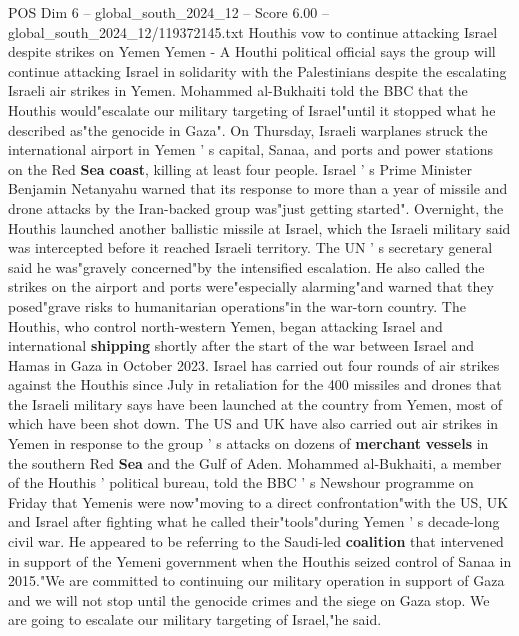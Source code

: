 \begin{textsample}{POS Dim 6 – global\_south\_2024\_12 – Score 6.00 – global\_south\_2024\_12/119372145.txt}  \label{ex:f6_pos_427}
Houthis vow to continue attacking Israel despite strikes on Yemen Yemen - A Houthi political official says the group will continue attacking Israel in solidarity with the Palestinians despite the escalating Israeli air strikes in Yemen.
Mohammed al-Bukhaiti told the BBC that the Houthis would"escalate our military targeting of Israel"until it stopped what he described as"the genocide in Gaza".
On Thursday, Israeli warplanes struck the international airport in Yemen ' s capital, Sanaa, and ports and power stations on the Red \textbf{Sea} \textbf{coast}, killing at least four people.
Israel ' s Prime Minister Benjamin Netanyahu warned that its response to more than a year of missile and drone attacks by the Iran-backed group was"just getting started".
Overnight, the Houthis launched another ballistic missile at Israel, which the Israeli military said was intercepted before it reached Israeli territory.
The UN ' s secretary general said he was"gravely concerned"by the intensified escalation.
He also called the strikes on the airport and ports were"especially alarming"and warned that they posed"grave risks to humanitarian operations"in the war-torn country.
The Houthis, who control north-western Yemen, began attacking Israel and international \textbf{shipping} shortly after the start of the war between Israel and Hamas in Gaza in October 2023.
Israel has carried out four rounds of air strikes against the Houthis since July in retaliation for the 400 missiles and drones that the Israeli military says have been launched at the country from Yemen, most of which have been shot down.
The US and UK have also carried out air strikes in Yemen in response to the group ' s attacks on dozens of \textbf{merchant} \textbf{vessels} in the southern Red \textbf{Sea} and the Gulf of Aden.
Mohammed al-Bukhaiti, a member of the Houthis ' political bureau, told the BBC ' s Newshour programme on Friday that Yemenis were now"moving to a direct confrontation"with the US, UK and Israel after fighting what he called their"tools"during Yemen ' s decade-long civil war.
He appeared to be referring to the Saudi-led \textbf{coalition} that intervened in support of the Yemeni government when the Houthis seized control of Sanaa in 2015."We are committed to continuing our military operation in support of Gaza and we will not stop until the genocide crimes and the siege on Gaza stop.
We are going to escalate our military targeting of Israel,"he said.

\end{textsample}
